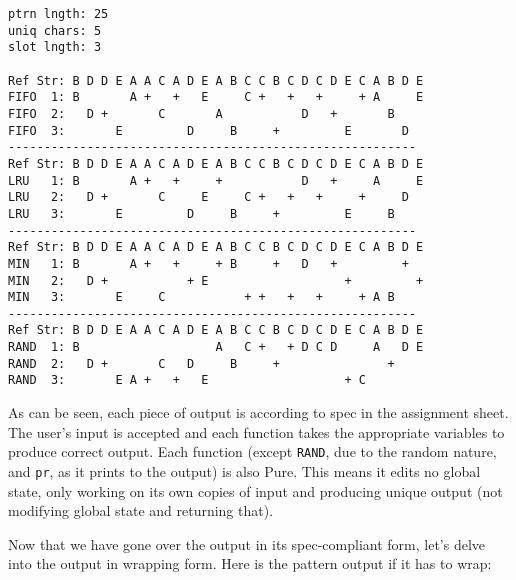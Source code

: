 \documentclass[11pt]{article}
\begin{document}
\begin{lstlisting}
ptrn lngth: 25
uniq chars: 5
slot lngth: 3

Ref Str: B D D E A A C A D E A B C C B C D C D E C A B D E
FIFO  1: B       A +   +   E     C +   +   +     + A     E
FIFO  2:   D +       C       A           D   +       B
FIFO  3:       E         D     B     +         E       D
---------------------------------------------------------
Ref Str: B D D E A A C A D E A B C C B C D C D E C A B D E
LRU   1: B       A +   +     +           D   +     A     E
LRU   2:   D +       C     E     C +   +   +     +     D
LRU   3:       E         D     B     +         E     B
---------------------------------------------------------
Ref Str: B D D E A A C A D E A B C C B C D C D E C A B D E
MIN   1: B       A +   +     + B     +   D   +         +
MIN   2:   D +           + E                   +         +
MIN   3:       E     C           + +   +   +     + A B
---------------------------------------------------------
Ref Str: B D D E A A C A D E A B C C B C D C D E C A B D E
RAND  1: B                   A   C +   + D C D     A   D E
RAND  2:   D +       C   D     B     +               +
RAND  3:       E A +   +   E                   + C
\end{lstlisting}

As can be seen, each piece of output is according to spec in the assignment sheet.
The user's input is accepted and each function takes the appropriate variables to produce correct output.
Each function (except \texttt{RAND}, due to the random nature, and \texttt{pr}, as it prints to the output) is also Pure.
This means it edits no global state, only working on its own copies of input and producing unique output (not modifying global state and returning that).

Now that we have gone over the output in its spec-compliant form, let's delve into the output in wrapping form.
Here is the pattern output if it has to wrap:
\end{document}
